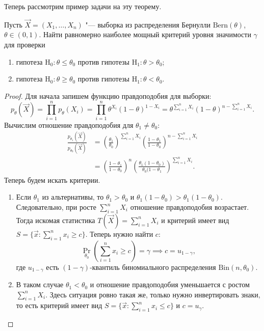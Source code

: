 Теперь рассмотрим пример задачи на эту теорему.
\begin{problem}
	Пусть $\vec{X} = (X_{1}, \ldots, X_{n})$ "--- выборка из распределения Бернулли $\mathrm{Bern}(\theta)$, $\theta \in (0, 1)$. Найти равномерно наиболее мощный критерий уровня значимости $\gamma$ для проверки
	\begin{enumerate}[label=\alph*)]
		\item гипотеза $\mathrm{H}_{0} \colon \theta \leq \theta_{0}$ против гипотезы $\mathrm{H}_{1} \colon \theta > \theta_{0}$;
		\item гипотеза $\mathrm{H}_{0} \colon \theta \geq \theta_{0}$ против гипотезы $\mathrm{H}_{1} \colon \theta < \theta_{0}$.
	\end{enumerate}
\end{problem}
\begin{proof}
	Для начала запишем функцию правдоподобия для выборки:
	\begin{equation}
		p_{\theta}(\vec{X})
		= \prod_{i = 1}^{n} p_{\theta}(X_{i})
		= \prod_{i = 1}^{n} \theta^{X_{i}}(1 - \theta)^{1 - X_{i}}
		= \theta^{\sum_{i = 1}^{n} X_{i}}(1 - \theta)^{n - \sum_{i = 1}^{n} X_{i}}.
	\end{equation}
	Вычислим отношение правдоподобия для $\theta_{1} \neq \theta_{0}$:
	\begin{align}
		\frac{p_{\theta_{1}}(\vec{X})}{p_{\theta_{0}}(\vec{X})}
		&= \left(\frac{\theta_{1}}{\theta_{0}}\right)^{\sum_{i = 1}^{n} X_{i}}\left(\frac{1 - \theta_{1}}{1 - \theta_{0}}\right)^{n - \sum_{i = 1}^{n} X_{i}} \\
		&= \left(\frac{1 - \theta_{1}}{1 - \theta_{0}}\right)^{n}\left(\frac{\theta_{1}(1 - \theta_{0})}{\theta_{0}(1 - \theta_{1}}\right)^{\sum_{i = 1}^{n} X_{i}}.
	\end{align}
	Теперь будем искать критерии. 
	\begin{enumerate}[label=\alph*)]
		\item Если $\theta_{1}$ из альтернативы, то $\theta_{1} > \theta_{0}$ и $\theta_{1}(1 - \theta_{0}) > \theta_{1}(1 - \theta_{0})$. Следовательно, при росте $\sum_{i = 1}^{n} X_{i}$ отношение правдоподобия возрастает. Тогда искомая статистика $T(\vec{X}) = \sum_{i = 1}^{n} X_{i}$ и критерий имеет вид $S = \{\vec{x} \colon \sum_{i = 1}^{n} x_{i} \geq c\}$. Теперь нужно найти $c$:
		\begin{equation}
			\Pr_{\theta_{0}}(\sum_{i = 1}^{n} x_{i} \geq c) = \gamma
			\implies
			c = u_{1 - \gamma},
		\end{equation}
		где $u_{1 - \gamma}$ есть $(1 - \gamma)$-квантиль биномиального распределения $\mathrm{Bin}(n, \theta_{0})$.
		\item В таком случае $\theta_{1} < \theta_{0}$ и отношение правдоподобия уменьшается с ростом $\sum_{i = 1}^{n} X_{i}$. Здесь ситуация ровно такая же, только нужно инвертировать знаки, то есть критерий имеет вид $S = \{\vec{x} \colon \sum_{i = 1}^{n} x_{i} \leq c\}$ и $c = u_{\gamma}$.
	\end{enumerate}
\end{proof}